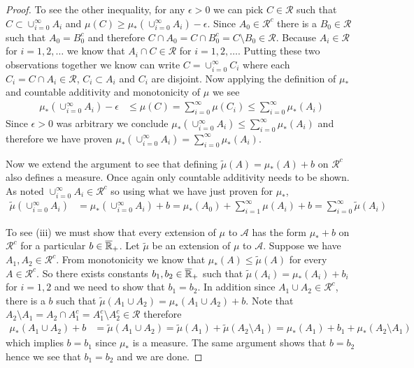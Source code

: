 \documentclass{amsart}
\theoremstyle{remark}
\theoremstyle{definition}
\begin{document}
\begin{proof}
To see the other inequality, for any $\epsilon >0$ we can pick $C \in
\mathcal{R}$ such that $C \subset \cup_{i=0}^\infty A_i$ and $\mu(C)
\geq \mu_*(\cup_{i=0}^\infty A_i) - \epsilon$.  Since $A_0 \in
\mathcal{R}^c$ there is a $B_0 \in \mathcal{R}$ such that $A_0 =
B_0^c$ and therefore $C \cap A_0 = C \cap B_0^c = C\setminus B_0 \in
\mathcal{R}$.  Because $A_i \in \mathcal{R}$ for $i=1,2,\dotsc$ we
know that $A_i \cap C \in \mathcal{R}$ for $i=1,2, \dotsc$.  Putting
these two observations together we know can write $C =
\cup_{i=0}^\infty C_i$ where each $C_i = C \cap A_i \in \mathcal{R}$,
$C_i \subset A_i$ and $C_i$ are disjoint.  Now applying the definition
of $\mu_*$ and countable additivity and monotonicity of $\mu$ we see
\begin{align*}
\mu_*(\cup_{i=0}^\infty A_i) - \epsilon &\leq \mu(C) = \sum_{i=0}^\infty \mu(C_i) \leq \sum_{i=0}^\infty \mu_*(A_i)
\end{align*}
Since $\epsilon > 0$ was arbitrary we conclude
$\mu_*(\cup_{i=0}^\infty A_i)  \leq \sum_{i=0}^\infty
\mu_*(A_i)$ and therefore we have proven $\mu_*(\cup_{i=0}^\infty A_i)  = \sum_{i=0}^\infty
\mu_*(A_i)$.

Now we extend the argument to see that defining $\tilde{\mu}(A) =
\mu_*(A) + b$ on $\mathcal{R}^c$ also defines a measure.  Once again
only countable additivity needs to be shown.  As noted
$\cup_{i=0}^\infty A_i \in \mathcal{R}^c$ so using what we have just
proven for $\mu_*$,
\begin{align*}
\tilde{\mu}(\cup_{i=0}^\infty A_i) &= \mu_*(\cup_{i=0}^\infty A_i ) +
b = \mu_*(A_0) + \sum_{i=1}^\infty \mu(A_i) + b = \sum_{i=0}^\infty \tilde{\mu}(A_i)
\end{align*}

To see (iii) we must show that every extension of $\mu$ to
$\mathcal{A}$ has the form $\mu_* + b$ on $\mathcal{R}^c$ for a particular $b \in
\overline{\mathbb{R}}_+$.  Let $\tilde{\mu}$ be an extension of $\mu$ to
$\mathcal{A}$.  Suppose we have $A_1, A_2 \in
\mathcal{R}^c$.  From monotonicity we know that
$\mu_*(A) \leq \tilde{\mu}(A)$ for every $A\in \mathcal{R}^c$.  So
there exists constants $b_1, b_2 \in \overline{\mathbb{R}}_+$ such that
$\tilde{\mu}(A_i) = \mu_*(A_i) + b_i$ for $i=1,2$ and we need to show
that $b_1 = b_2$.   In addition since $A_1 \cup A_2 \in \mathcal{R}^c$, there is a $b$ such that
$\tilde{\mu}(A_1 \cup A_2) = \mu_*(A_1 \cup A_2) + b$.  Note that $A_2 \setminus A_1 = A_2 \cap A_1^c = A_1^c
\setminus A_2^c \in \mathcal{R}$ therefore
\begin{align*}
\mu_*(A_1 \cup A_2) + b &= \tilde{\mu}(A_1 \cup A_2) =
\tilde{\mu}(A_1) + \tilde{\mu}(A_2 \setminus A_1) = \mu_*(A_1) + b_1 +
\mu_*(A_2 \setminus A_1)
\end{align*}
which implies $b = b_1$ since $\mu_*$ is a measure.  The same argument
shows that $b = b_2$ hence we see that $b_1 = b_2$ and we are done.


\end{proof}
\end{document}
